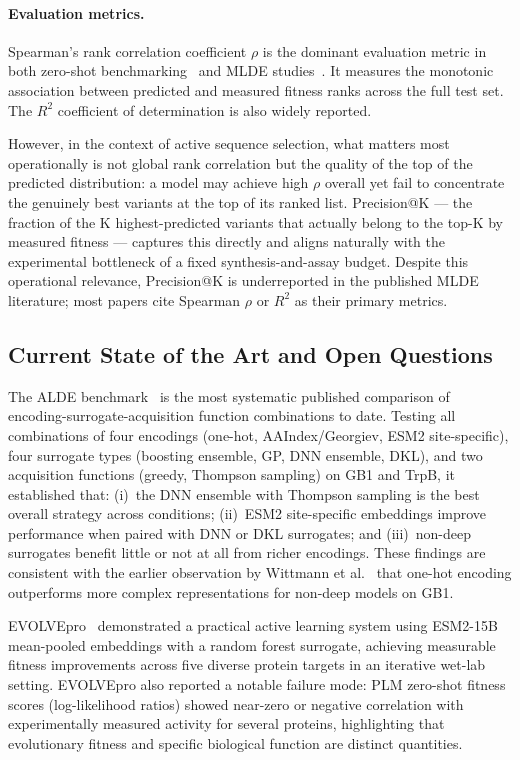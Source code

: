 \documentclass[english, 12pt, a4paper, elec, utf8, a-2b, online]{aaltothesis}
\begin{document}
\paragraph{Evaluation metrics.}
Spearman's rank correlation coefficient $\rho$ is the dominant evaluation metric in both
zero-shot benchmarking~\cite{Notin2023ProteinGym} and MLDE studies~\cite{Wu2019, Yang2025}.
It measures the monotonic association between predicted and measured fitness ranks across the
full test set.
The $R^2$ coefficient of determination is also widely reported.

However, in the context of active sequence selection, what matters most operationally is not
global rank correlation but the quality of the top of the predicted distribution:
a model may achieve high $\rho$ overall yet fail to concentrate the genuinely best variants
at the top of its ranked list.
Precision@K --- the fraction of the K highest-predicted variants that actually belong to the
top-K by measured fitness --- captures this directly and aligns naturally with the experimental
bottleneck of a fixed synthesis-and-assay budget.
Despite this operational relevance, Precision@K is underreported in the published MLDE
literature; most papers cite Spearman $\rho$ or $R^2$ as their primary metrics.

\subsection{Current State of the Art and Open Questions}
\label{sec:litrev:sota}

The ALDE benchmark~\cite{Yang2025} is the most systematic published comparison of
encoding-surrogate-acquisition function combinations to date.
Testing all combinations of four encodings (one-hot, AAIndex/Georgiev, ESM2 site-specific),
four surrogate types (boosting ensemble, GP, DNN ensemble, DKL), and two acquisition functions
(greedy, Thompson sampling) on GB1 and TrpB, it established that:
(i)\ the DNN ensemble with Thompson sampling is the best overall strategy across conditions;
(ii)\ ESM2 site-specific embeddings improve performance when paired with DNN or DKL surrogates;
and (iii)\ non-deep surrogates benefit little or not at all from richer encodings.
These findings are consistent with the earlier observation by Wittmann et al.~\cite{Wittmann2021}
that one-hot encoding outperforms more complex representations for non-deep models on GB1.

EVOLVEpro~\cite{Liu2024EVOLVEpro} demonstrated a practical active learning system using
ESM2-15B mean-pooled embeddings with a random forest surrogate, achieving measurable fitness
improvements across five diverse protein targets in an iterative wet-lab setting.
EVOLVEpro also reported a notable failure mode: PLM zero-shot fitness scores (log-likelihood
ratios) showed near-zero or negative correlation with experimentally measured activity for
several proteins, highlighting that evolutionary fitness and specific biological function are
distinct quantities.
\end{document}
